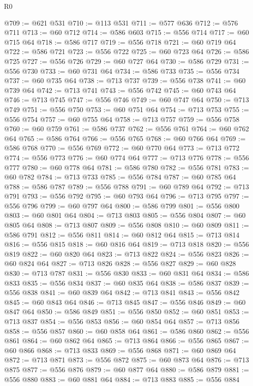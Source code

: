 \begin{lexlean}{R0}
\begin{coremodule}
@709 := @621 @531
@710 := @113 @531
@711 := @577 @636
@712 := @576 @711
@713 := @60 @712
@714 := @586 @603
@715 := @556 @714
@717 := @60 @715 @64
@718 := @586 @717
@719 := @556 @718
@721 := @60 @719 @64
@722 := @586 @721
@723 := @556 @722
@725 := @60 @723 @64
@726 := @586 @725
@727 := @556 @726
@729 := @60 @727 @64
@730 := @586 @729
@731 := @556 @730
@733 := @60 @731 @64
@734 := @586 @733
@735 := @556 @734
@737 := @60 @735 @64
@738 := @713 @737
@739 := @556 @738
@741 := @60 @739 @64
@742 := @713 @741
@743 := @556 @742
@745 := @60 @743 @64
@746 := @713 @745
@747 := @556 @746
@749 := @60 @747 @64
@750 := @713 @749
@751 := @556 @750
@753 := @60 @751 @64
@754 := @713 @753
@755 := @556 @754
@757 := @60 @755 @64
@758 := @713 @757
@759 := @556 @758
@760 := @60 @759
@761 := @586 @737
@762 := @556 @761
@764 := @60 @762 @64
@765 := @586 @764
@766 := @556 @765
@768 := @60 @766 @64
@769 := @586 @768
@770 := @556 @769
@772 := @60 @770 @64
@773 := @713 @772
@774 := @556 @773
@776 := @60 @774 @64
@777 := @713 @776
@778 := @556 @777
@780 := @60 @778 @64
@781 := @586 @780
@782 := @556 @781
@783 := @60 @782
@784 := @713 @733
@785 := @556 @784
@787 := @60 @785 @64
@788 := @586 @787
@789 := @556 @788
@791 := @60 @789 @64
@792 := @713 @791
@793 := @556 @792
@795 := @60 @793 @64
@796 := @713 @795
@797 := @556 @796
@799 := @60 @797 @64
@800 := @586 @799
@801 := @556 @800
@803 := @60 @801 @64
@804 := @713 @803
@805 := @556 @804
@807 := @60 @805 @64
@808 := @713 @807
@809 := @556 @808
@810 := @60 @809
@811 := @586 @791
@812 := @556 @811
@814 := @60 @812 @64
@815 := @713 @814
@816 := @556 @815
@818 := @60 @816 @64
@819 := @713 @818
@820 := @556 @819
@822 := @60 @820 @64
@823 := @713 @822
@824 := @556 @823
@826 := @60 @824 @64
@827 := @713 @826
@828 := @556 @827
@829 := @60 @828
@830 := @713 @787
@831 := @556 @830
@833 := @60 @831 @64
@834 := @586 @833
@835 := @556 @834
@837 := @60 @835 @64
@838 := @586 @837
@839 := @556 @838
@841 := @60 @839 @64
@842 := @713 @841
@843 := @556 @842
@845 := @60 @843 @64
@846 := @713 @845
@847 := @556 @846
@849 := @60 @847 @64
@850 := @586 @849
@851 := @556 @850
@852 := @60 @851
@853 := @713 @837
@854 := @556 @853
@856 := @60 @854 @64
@857 := @713 @856
@858 := @556 @857
@860 := @60 @858 @64
@861 := @586 @860
@862 := @556 @861
@864 := @60 @862 @64
@865 := @713 @864
@866 := @556 @865
@867 := @60 @866
@868 := @713 @833
@869 := @556 @868
@871 := @60 @869 @64
@872 := @713 @871
@873 := @556 @872
@875 := @60 @873 @64
@876 := @713 @875
@877 := @556 @876
@879 := @60 @877 @64
@880 := @586 @879
@881 := @556 @880
@883 := @60 @881 @64
@884 := @713 @883
@885 := @556 @884

\end{coremodule}
\end{lexlean}
